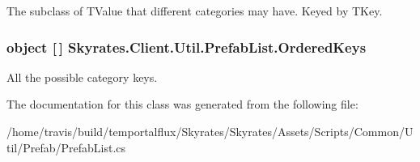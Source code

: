 The subclass of T\-Value that different categories may have. Keyed by T\-Key. 

\hypertarget{class_skyrates_1_1_client_1_1_util_1_1_prefab_list_a287ed0c2748a27d810901e9edaef2762}{
\subsubsection[{Ordered\-Keys}]{\setlength{\rightskip}{0pt plus 5cm}object \mbox{[}$\,$\mbox{]} Skyrates.\-Client.\-Util.\-Prefab\-List.\-Ordered\-Keys}}\label{class_skyrates_1_1_client_1_1_util_1_1_prefab_list_a287ed0c2748a27d810901e9edaef2762}


All the possible category keys. 



The documentation for this class was generated from the following file\-:\begin{DoxyCompactItemize}
\item 
/home/travis/build/temportalflux/\-Skyrates/\-Skyrates/\-Assets/\-Scripts/\-Common/\-Util/\-Prefab/Prefab\-List.\-cs\end{DoxyCompactItemize}

